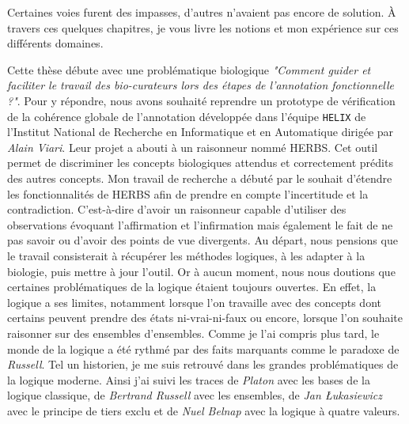 \begin{refsegment}
Certaines voies furent des impasses, d'autres n'avaient pas encore de solution. À travers ces quelques chapitres, je vous livre les notions et mon expérience sur ces différents domaines.

Cette thèse débute avec une problématique biologique \textit{"Comment guider et faciliter le travail des bio-curateurs lors des étapes de l'annotation fonctionnelle ?"}. Pour y répondre, nous avons souhaité reprendre un prototype de vérification de la cohérence globale de l'annotation développée dans l'équipe \texttt{HELIX} de l'Institut National de Recherche en Informatique et en Automatique dirigée par \textit{Alain Viari}. Leur projet a abouti à un raisonneur nommé \gls{HERBS}. Cet outil permet de discriminer les concepts biologiques attendus et correctement prédits des autres concepts. Mon travail de recherche a débuté par le souhait d'étendre les fonctionnalités de \gls{HERBS} afin de prendre en compte l'incertitude et la contradiction. C'est-à-dire d'avoir un raisonneur capable d'utiliser des observations évoquant l'affirmation et l'infirmation mais également le fait de ne pas savoir ou d'avoir des points de vue divergents. Au départ, nous pensions que le travail consisterait à récupérer les méthodes logiques, à les adapter à la biologie, puis mettre à jour l'outil. Or à aucun moment, nous nous doutions que certaines problématiques de la logique étaient toujours ouvertes. En effet, la logique a ses limites, notamment lorsque l'on travaille avec des concepts dont certains peuvent prendre des états ni-vrai-ni-faux ou encore, lorsque l'on souhaite raisonner sur des ensembles d'ensembles. Comme je l'ai compris plus tard, le monde de la logique a été rythmé par des faits marquants comme le paradoxe de \textit{Russell}. Tel un historien, je me suis retrouvé dans les grandes problématiques de la logique moderne. Ainsi j'ai suivi les traces de \textit{Platon} avec les bases de la logique classique, de \textit{Bertrand Russell} avec les ensembles, de \textit{Jan Łukasiewicz} avec le principe de tiers exclu et de \textit{Nuel Belnap} avec la logique à quatre valeurs.

\end{refsegment}

